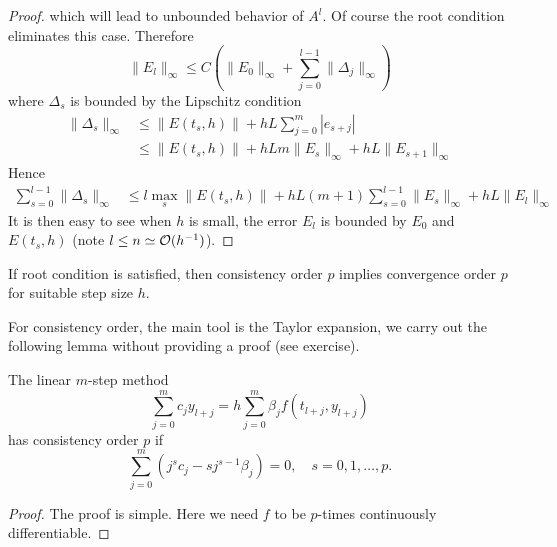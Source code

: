 \begin{proof}
    which will lead to unbounded behavior of $A^l$. Of course the root condition eliminates this case. Therefore 
    \begin{equation}
        \|E_{l}\|_{\infty} \le C \left( \|E_0\|_{\infty} + \sum_{j=0}^{l-1} \|\Delta_j\|_{\infty}\right) 
    \end{equation}
    where $\Delta_s$ is bounded by the Lipschitz condition 
    \begin{equation}
        \begin{aligned}
            \|\Delta_s\|_{\infty} & \le \|E(t_s, h)\| + h L \sum_{j=0}^m |e_{s+j}| \\
            & \le        \|E(t_s, h)\| + h L m \|E_s\|_{\infty} + hL \|E_{s+1}\|_{\infty}
        \end{aligned}
    \end{equation}
    Hence 
    \begin{equation}
        \begin{aligned}
           \sum_{s = 0}^{l-1} \|\Delta_s\|_{\infty} & \le l\max_{s}\|E(t_s, h)\| + h L (m +1) \sum_{s=0}^{l-1}\|E_s\|_{\infty} + hL \|E_{l}\|_{\infty}  
        \end{aligned}
    \end{equation}
    It is then easy to see when $h$ is small, the error $E_l$ is bounded by $E_0$ and $E(t_s, h)$ (note $l\le n\simeq \mathcal O(h^{-1})$). 
\end{proof}
\begin{corollary}
    If root condition is satisfied, then consistency order $p$ implies convergence order $p$ for suitable step size $h$.
\end{corollary} 
For consistency order, the main tool is the Taylor expansion, we carry out the following lemma without providing a proof (see exercise). 
\begin{lemma}\label{Lem: 6-CONSISTENCY}
    The linear $m$-step method 
    \begin{equation}
        \sum_{j=0}^m c_j y_{l+j} = h \sum_{j=0}^m \beta_j f(t_{l + j}, y_{l+j})
    \end{equation}
    has consistency order $p$ if 
    \begin{equation}
        \sum_{j=0}^m (j^s c_j - s j^{s-1}\beta_j) = 0,\quad s = 0,1,\dots, p.
    \end{equation}
\end{lemma}
\begin{proof}
    The proof is simple. Here we need $f$ to be $p$-times continuously differentiable.
\end{proof}
